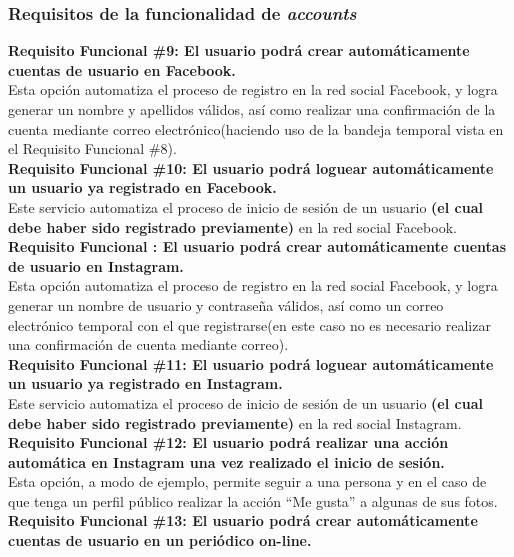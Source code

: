 \subsubsection{Requisitos de la funcionalidad de \textit{accounts}}
\begin{adjustwidth}{0.5cm}{}
	\textbf{Requisito Funcional \#9: El usuario podrá crear automáticamente cuentas de usuario en Facebook.}\\
	Esta opción automatiza el proceso de registro en la red social Facebook, y logra generar un nombre y apellidos válidos, así como realizar una confirmación de la cuenta mediante correo electrónico(haciendo uso de la bandeja temporal vista en el Requisito Funcional \#8).\\
	\linebreak
	\textbf{Requisito Funcional \#10: El usuario podrá loguear automáticamente un usuario ya registrado en Facebook.}\\
	Este servicio automatiza el proceso de inicio de sesión de un usuario \textbf{(el cual debe haber sido registrado previamente)} en la red social Facebook. \\
	\linebreak
	\textbf{Requisito Funcional : El usuario podrá crear automáticamente cuentas de usuario en Instagram.}\\
	Esta opción automatiza el proceso de registro en la red social Facebook, y logra generar un nombre de usuario y contraseña válidos, así como un correo electrónico temporal con el que registrarse(en este caso no es necesario realizar una confirmación de cuenta mediante correo).\\
	\linebreak
	\textbf{Requisito Funcional \#11: El usuario podrá loguear automáticamente un usuario ya registrado en Instagram.}\\
	Este servicio automatiza el proceso de inicio de sesión de un usuario \textbf{(el cual debe haber sido registrado previamente)} en la red social Instagram. \\
	\linebreak	
	\textbf{Requisito Funcional \#12: El usuario podrá realizar una acción automática en Instagram una vez realizado el inicio de sesión.}\\
	Esta opción, a modo de ejemplo, permite seguir a una persona y en el caso de que tenga un perfil público realizar la acción ``Me gusta'' a algunas de sus fotos. \\
	\linebreak
	\textbf{Requisito Funcional \#13: El usuario podrá crear automáticamente cuentas de usuario en un periódico on-line.}\\

\end{adjustwidth}
